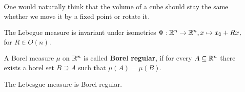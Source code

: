 One would naturally think that the volume of a cube should stay the same whether we move it by a fixed point or rotate it.
\begin{thm}[]
  The Lebegue measure is invariant under isometries $\Phi: \mathbb{R}^{n} \to \mathbb{R}^{n}, x \mapsto x_0 + Rx$, for $R \in O(n)$.
\end{thm}


\begin{dfn}[]
  A Borel measure $\mu$ on $\mathbb{R}^{n}$ is called \textbf{Borel regular}, if for every $A \subseteq \mathbb{R}^{n}$ there exists a borel set $B \supseteq A$ such that $\mu(A) = \mu(B)$.
\end{dfn}
The Lebesgue measure is Borel regular.


